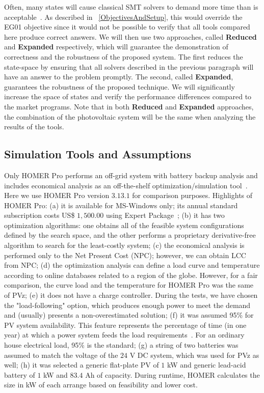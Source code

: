 \documentclass[journal]{IEEEtran}
\begin{document}
Often, many states will cause classical SMT solvers to demand more time than is acceptable~\cite{abs-1909-13139}. As described in ~\ref{ObjectivesAndSetup}, this would override the EG01 objective since it would not be possible to verify that all tools compared here produce correct answers. We will then use two approaches, called \textbf{Reduced} and \textbf{Expanded} respectively, which will guarantee the demonstration of correctness and the robustness of the proposed system. The first reduces the state-space by ensuring that all solvers described in the previous paragraph will have an answer to the problem promptly. The second, called \textbf{Expanded}, guarantees the robustness of the proposed technique. We will significantly increase the space of states and verify the performance differences compared to the market programs. Note that in both \textbf{Reduced} and \textbf{Expanded} approaches, the combination of the photovoltaic system will be the same when analyzing the results of the tools.

\subsection{Simulation Tools and Assumptions}
\label{sec:SimulationToolsandAssumptions}

Only HOMER Pro performs an off-grid system with battery backup analysis and includes economical analysis as an off-the-shelf optimization/simulation tool~\cite{Pradhan,Swarnkar}. Here we use HOMER Pro version $3.13.1$ for comparison purposes. Highlights of HOMER Pro:
%
(a) it is available for MS-Windows only; its annual standard subscription costs US\$ $1,500.00$ using Expert Package~\cite{HOMER};
(b) it has two optimization algorithms: one obtains all of the feasible system configurations defined by the search space, and the other performs a proprietary derivative-free algorithm to search for the least-costly system;
(c) the economical analysis is performed only to the Net Present Cost (NPC); however, we can obtain LCC from NPC; 
(d) the optimization analysis can define a load curve and temperature according to online databases related to a region of the globe. However, for a fair comparison, the curve load and the temperature for HOMER Pro was the same of PVz; 
(e) it does not have a charge controller. During the tests, we have chosen the "load-following" option, which produces enough power to meet the demand~\cite{HOMER} and (usually) presents a non-overestimated solution; 
(f) it was assumed 95\% for PV system availability. This feature represents the percentage of time (in one year) at which a power system feeds the load requirements~\cite{Khatib2014}. For an ordinary house electrical load, 95\% is the standard;
(g) a string of two batteries was assumed to match the voltage of the $24$ V DC system, which was used for PVz as well; 
(h) it was selected a generic flat-plate PV of $1$ kW and generic lead-acid battery of $1$ kW and $83.4$ Ah of capacity. During runtime, HOMER calculates the size in kW of each arrange based on feasibility and lower cost.
\end{document}
